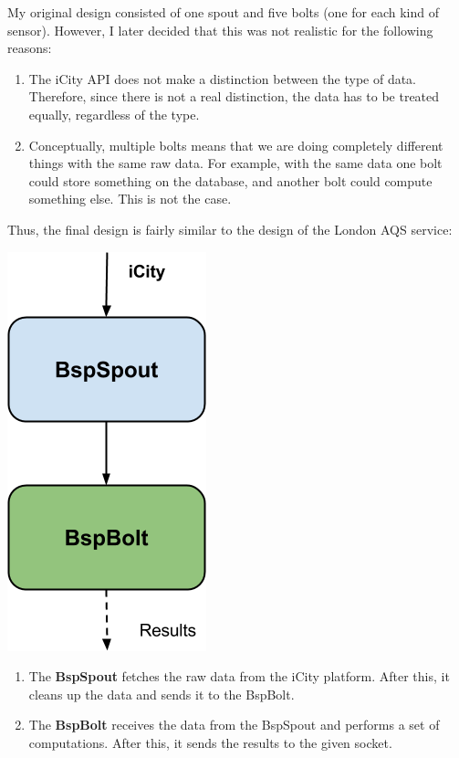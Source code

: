 My original design consisted of one spout and five bolts (one for each kind of
sensor). However, I later decided that this was not realistic for the following
reasons:

\begin{enumerate}
  \itemsep0em
  \item The iCity API does not make a distinction between the type of data.
Therefore, since there is not a real distinction, the data has to be treated
equally, regardless of the type.
  \item Conceptually, multiple bolts means that we are doing completely
different things with the same raw data. For example, with the same data one
bolt could store something on the database, and another bolt could compute
something else. This is not the case.
\end{enumerate}

Thus, the final design is fairly similar to the design of the London AQS
service:

\begin{center}
  \includegraphics[scale=0.6]{implementation/images/bsp.png}
\end{center}

\begin{enumerate}
  \itemsep0em
  \item The {\bf BspSpout} fetches the raw data from the iCity platform. After
this, it cleans up the data and sends it to the BspBolt.
  \item The {\bf BspBolt} receives the data from the BspSpout and performs a
set of computations. After this, it sends the results to the given socket.
\end{enumerate}

